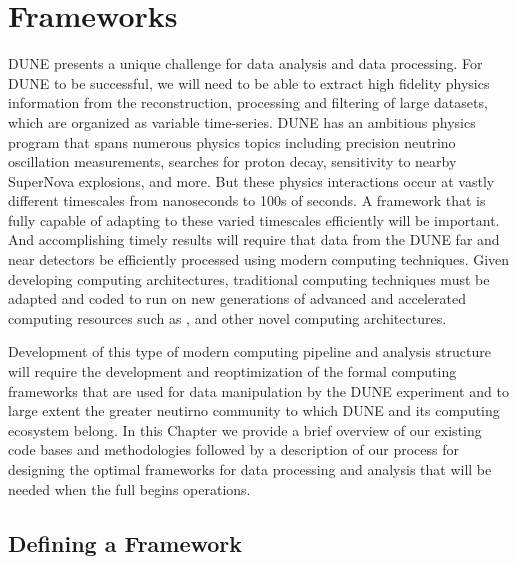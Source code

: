 \documentclass[../main-v1.tex]{subfiles}
\begin{document}
\chapter{Frameworks}\label{ch:fworks}

DUNE presents a unique challenge for data analysis and data processing. For DUNE to be successful, we will need to be able to extract high fidelity physics information from the reconstruction, processing and filtering of large datasets, which are organized as variable time-series.   DUNE has an ambitious physics program that spans numerous physics topics including precision neutrino oscillation measurements, searches for proton decay, sensitivity to nearby SuperNova explosions, and more. But these physics interactions occur at vastly different timescales from nanoseconds to 100s of seconds. A framework that is fully capable of adapting to these varied timescales efficiently will be important. And accomplishing timely results will require that data from the DUNE far and near detectors  be efficiently processed using modern computing techniques. Given developing computing architectures, traditional  computing techniques must be adapted and coded to run on new generations of advanced and accelerated computing resources such as ,  and other novel computing architectures.  

Development of this type of modern computing pipeline and analysis structure will require the development and reoptimization of the formal computing frameworks that are used for data manipulation by the DUNE experiment and to large extent the greater neutirno community to which DUNE and its computing ecosystem belong.
In this Chapter we provide a brief overview of our existing code bases and methodologies followed by a description of our process for designing the optimal frameworks for data processing and analysis that will be needed when the full  begins operations.  

\section{Defining a Framework}\label{sec:framework:def}
\end{document}
